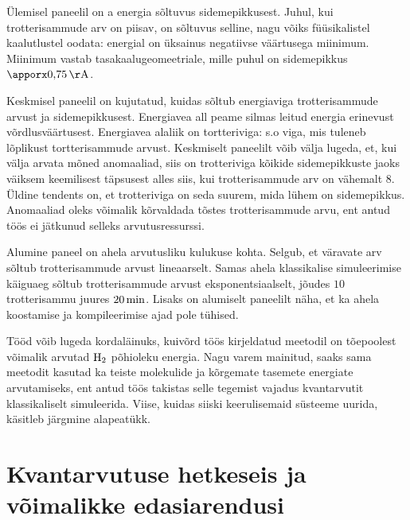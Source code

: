 \documentclass[12pt]{report}
\begin{document}
Ülemisel paneelil on a energia sõltuvus sidemepikkusest.
Juhul, kui trotterisammude arv on piisav, on sõltuvus selline, nagu võiks füüsikalistel kaalutlustel oodata: energial on üksainus negatiivse väärtusega miinimum.
Miinimum vastab tasakaalugeomeetriale, mille puhul on sidemepikkus \(\apporx0{,}75\,{\rm Å}\).

Keskmisel paneelil on kujutatud, kuidas sõltub energiaviga trotterisammude arvust ja sidemepikkusest.
Energiavea all peame silmas leitud energia erinevust võrdlusväärtusest.
Energiavea alaliik on tortteriviga: s.o viga, mis tuleneb lõplikust tortterisammude arvust.
Keskmiselt paneelilt võib välja lugeda, et, kui välja arvata mõned anomaaliad, siis on trotteriviga kõikide sidemepikkuste jaoks väiksem keemilisest täpsusest alles siis, kui trotterisammude arv on vähemalt \(8\).
Üldine tendents on, et trotteriviga on seda suurem, mida lühem on sidemepikkus.
Anomaaliad oleks võimalik kõrvaldada tõstes trotterisammude arvu, ent antud töös ei jätkunud selleks arvutusressurssi.

Alumine paneel on ahela arvutusliku kulukuse kohta.
Selgub, et väravate arv sõltub trotterisammude arvust lineaarselt.
Samas ahela klassikalise simuleerimise käiguaeg sõltub trotterisammude arvust eksponentsiaalselt, jõudes \(10\) trotterisammu juures \(20\,{\rm min}\).
Lisaks on alumiselt paneelilt näha, et ka ahela koostamise ja kompileerimise ajad pole tühised.

Tööd võib lugeda kordaläinuks, kuivõrd töös kirjeldatud meetodil on tõepoolest võimalik arvutad \(\rm H_2\) põhioleku energia.
Nagu varem mainitud, saaks sama meetodit kasutad ka teiste molekulide ja kõrgemate tasemete energiate arvutamiseks, ent antud töös takistas selle tegemist vajadus kvantarvutit klassikaliselt simuleerida.
Viise, kuidas siiski keerulisemaid süsteeme uurida, käsitleb järgmine alapeatükk.

\section{Kvantarvutuse hetkeseis ja võimalikke edasiarendusi}
\end{document}
